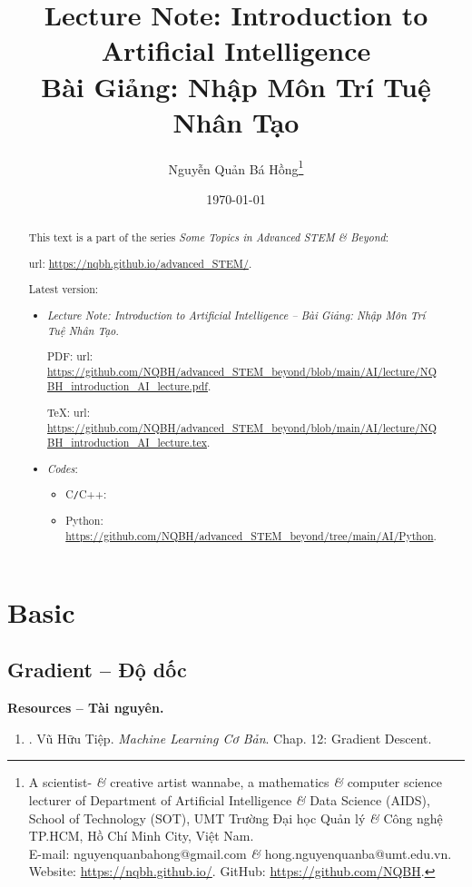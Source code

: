 \documentclass{article}
\title{Lecture Note: Introduction to Artificial Intelligence\\Bài Giảng: Nhập Môn Trí Tuệ Nhân Tạo}
\author{Nguyễn Quản Bá Hồng\footnote{A scientist- {\it\&} creative artist wannabe, a mathematics {\it\&} computer science lecturer of Department of Artificial Intelligence {\it\&} Data Science (AIDS), School of Technology (SOT), UMT Trường Đại học Quản lý {\it\&} Công nghệ TP.HCM, Hồ Chí Minh City, Việt Nam.\\E-mail: {\sf nguyenquanbahong@gmail.com} {\it\&} {\sf hong.nguyenquanba@umt.edu.vn}. Website: \url{https://nqbh.github.io/}. GitHub: \url{https://github.com/NQBH}.}}
\date{\today}
\begin{document}
\maketitle
\begin{abstract}
	This text is a part of the series {\it Some Topics in Advanced STEM \& Beyond}:
	
	{\sc url}: \url{https://nqbh.github.io/advanced_STEM/}.
	
	Latest version:
	\begin{itemize}
		\item {\it Lecture Note: Introduction to Artificial Intelligence -- Bài Giảng: Nhập Môn Trí Tuệ Nhân Tạo}.
		
		PDF: {\sc url}: \url{https://github.com/NQBH/advanced_STEM_beyond/blob/main/AI/lecture/NQBH_introduction_AI_lecture.pdf}.
		
		\TeX: {\sc url}: \url{https://github.com/NQBH/advanced_STEM_beyond/blob/main/AI/lecture/NQBH_introduction_AI_lecture.tex}.
		\item {\it Codes}:
		\begin{itemize}
			\item C{\tt/}C++:
			\item Python: \url{https://github.com/NQBH/advanced_STEM_beyond/tree/main/AI/Python}.
		\end{itemize}
	\end{itemize}
\end{abstract}
\tableofcontents


\section{Basic}

\subsection{Gradient -- Độ dốc}
\textbf{\textsf{Resources -- Tài nguyên.}}
\begin{enumerate}
	\item \cite{Tiep_ML_co_ban}. {\sc Vũ Hữu Tiệp}. {\it Machine Learning Cơ Bản}. Chap. 12: Gradient Descent.
\end{enumerate}
\end{document}
